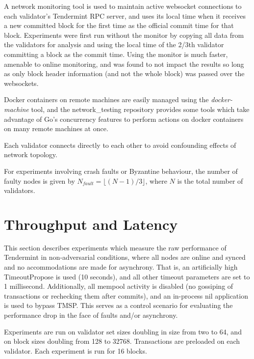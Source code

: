 A network monitoring tool is used to maintain active websocket connections 
to each validator's Tendermint RPC server,
and uses its local time when it receives a new committed block 
for the first time as the official commit time for that block.
Experiments were first run without the monitor by copying 
all data from the validators for analysis and using the local time
of the 2/3th validator committing a block as the commit time. 
Using the monitor is much faster, amenable to online monitoring, 
and was found to not impact the results 
so long as only block header information (and not the whole block) was passed over the websockets.

Docker containers on remote machines are easily managed using the \emph{docker-machine} tool, 
and the network\_testing repository provides some tools 
which take advantage of Go's concurrency features
to perform actions on docker containers on many remote machines at once.

Each validator connects directly to each other to avoid confounding effects of network topology.

For experiments involving crash faults or Byzantine behaviour, 
the number of faulty nodes is given by $N_{fault} = \lfloor(N-1)/3\rfloor$,
where $N$ is the total number of validators.

\section{Throughput and Latency}

This section describes experiments which measure the raw performance 
of Tendermint in non-adversarial conditions,
where all nodes are online and synced and no accommodations are made for asynchrony.
That is, an artificially high TimeoutPropose is used (10 seconds), 
and all other timeout parameters are set to 1 millisecond.
Additionally, all mempool activity is disabled 
(no gossiping of transactions or rechecking them after commits),
and an in-process nil application is used to bypass TMSP.
This serves as a control scenario for evaluating the performance drop in the face of faults and/or asynchrony.

Experiments are run on validator set sizes doubling in size from two to 64, and on block sizes doubling from 128 to 32768.
Transactions are preloaded on each validator. Each experiment is run for 16 blocks. 

